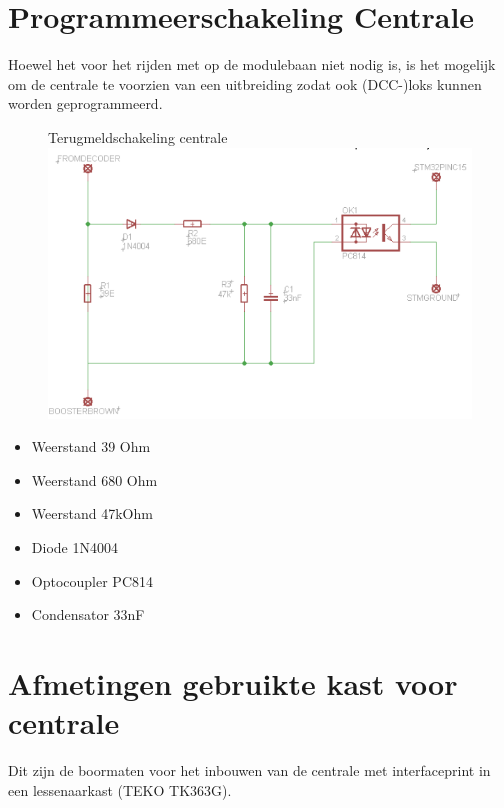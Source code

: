 \documentclass[12pt,a4paper]{report}
\begin{document}
\chapter{Programmeerschakeling Centrale}

Hoewel het voor het rijden met op de modulebaan niet nodig is, is het mogelijk om de centrale te voorzien van een uitbreiding zodat ook (DCC-)loks kunnen worden geprogrammeerd.

\begin{figure}[!ht]
  \captionbox
  {Terugmeldschakeling centrale}
  {\includegraphics[scale=0.7]{images/rcu-MDRRCII-ack}}
\end{figure}

\begin{itemize}
\item Weerstand 39 Ohm
\item Weerstand 680 Ohm
\item Weerstand 47kOhm
\item Diode 1N4004
\item Optocoupler PC814
\item Condensator 33nF
\end{itemize}

\chapter{Afmetingen gebruikte kast voor centrale}

Dit zijn de boormaten voor het inbouwen van de centrale met interfaceprint in een lessenaarkast (TEKO TK363G).
\end{document}
